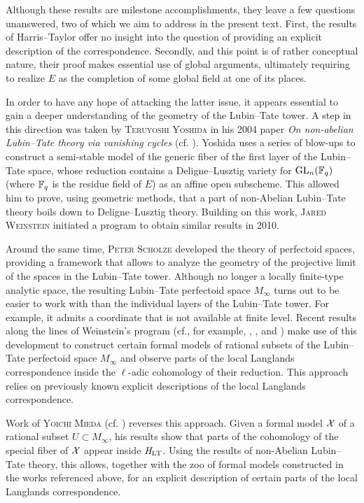 \documentclass[../main.tex]{subfiles}
\begin{document}
Although these results are milestone accomplishments, they leave a few questions
unanswered, two of which we aim to address in the present text. 
First, the results of Harris--Taylor offer no insight into the question of
providing an explicit description of the correspondence.
Secondly, and this point is of rather conceptual nature, their proof makes
essential use of global arguments, ultimately requiring to realize $E$ as the
completion of some global field at one of its places.

In order to have any hope of attacking the latter issue, it appears essential
to gain a deeper understanding of the geometry of the Lubin--Tate tower. 
A step in this direction was taken by \textsc{Teruyoshi Yoshida} in his
2004 paper \textit{On non-abelian Lubin--Tate theory via vanishing cycles}
(cf. \cite{yoshida2010non}).
Yoshida uses a series of blow-ups to construct a
semi-stable model of the generic fiber of the first layer of the Lubin--Tate space,
whose reduction contains a Deligne--Lusztig variety for $\operatorname{GL}_n(\mathbb{F}_q)$ (where
$\mathbb{F}_q$ is the residue field of $E$) as an affine open subscheme. This allowed
him to prove, using geometric methods, that a part of non-Abelian Lubin--Tate theory
boils down to Deligne--Lusztig theory. 
Building on this work, \textsc{Jared Weinstein} initiated a program
to obtain similar results in 2010. 

Around the same time, \textsc{Peter Scholze} developed the theory of perfectoid spaces,
providing a framework that allows to analyze the geometry of the projective limit 
of the spaces in the Lubin--Tate tower. 
Although no longer a locally finite-type analytic space, the resulting
Lubin--Tate perfectoid space $M_\infty$ turns out to be easier to work with than 
the individual layers of the Lubin--Tate tower. For example, it admits a
coordinate that is not available at finite level.
Recent results along the lines of Weinstein's program
(cf., for example, \cite{weinstein2016semistable},
\cite{BoyarchenkoWeinstein2011MaxVar}, \cite{imaitsushima2020affinoids} and 
\cite{tokimoto2020affinoids}) make use of this development to construct
certain formal models of rational subsets of the Lubin--Tate perfectoid space
$M_{\infty}$ and observe parts of the local Langlands correspondence
inside the $\ell$-adic cohomology of their reduction. This approach relies on
previously known explicit descriptions of the local Langlands
correspondence.

Work of \textsc{Yoichi Mieda} (cf. \cite{mieda2016geometric}) reverses this
approach. Given a formal model $\mathcal{X}$ of a rational subset $U \subset M_\infty$,
his results show that parts of the cohomology of the
special fiber of $\mathcal{X}$ appear inside $\mathit H_{\mathrm{LT}}$. Using the results of non-Abelian
Lubin--Tate theory, this allows, together with the zoo of formal models
constructed in the works referenced above, for an explicit description of
certain parts of the local Langlands correspondence.
\end{document}
